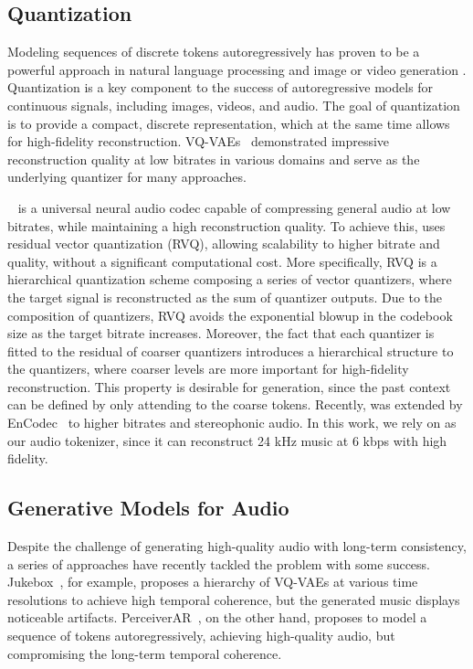 \subsection{Quantization} 

Modeling sequences of discrete tokens autoregressively has proven to be a powerful approach in natural language processing \citep{gpt3, lamda} and image or video generation \citep{esser2021taming,dalle,parti,phenaki}. Quantization is a key component to the success of autoregressive models for continuous signals, including images, videos, and audio. The goal of quantization is to provide a compact, discrete representation, which at the same time allows for high-fidelity reconstruction. VQ-VAEs~\citep{vqvae} demonstrated impressive reconstruction quality at low bitrates in various domains and serve as the underlying quantizer for many approaches.

\soundstream{}~\citep{soundstream} is a universal neural audio codec capable of compressing general audio at low bitrates, while maintaining a high reconstruction quality. To achieve this, \soundstream{} uses residual vector quantization (RVQ), allowing scalability to higher bitrate and quality, without a significant computational cost. More specifically, RVQ is a hierarchical quantization scheme composing a series of vector quantizers, where the target signal is reconstructed as the sum of quantizer outputs. Due to the composition of quantizers, RVQ avoids the exponential blowup in the codebook size as the target bitrate increases. Moreover, the fact that each quantizer is fitted to the residual of coarser quantizers introduces a hierarchical structure to the quantizers, where coarser levels are more important for high-fidelity reconstruction. This property is desirable for generation, since the past context can be defined by only attending to the coarse tokens. Recently, \soundstream{} was extended by EnCodec~\citep{defossez2022highfi} to higher bitrates and stereophonic audio. In this work, we rely on \soundstream{} as our audio tokenizer, since it can reconstruct 24 kHz music at 6 kbps with high fidelity. 

\subsection{Generative Models for Audio}

Despite the challenge of generating high-quality audio with long-term consistency, a series of approaches have recently tackled the problem with some success. Jukebox~\citep{jukebox}, for example, proposes a hierarchy of VQ-VAEs at various time resolutions to achieve high temporal coherence, but the generated music displays noticeable artifacts. PerceiverAR~\citep{perceiverAR}, on the other hand, proposes to model a sequence of \soundstream{} tokens autoregressively, achieving high-quality audio, but compromising the long-term temporal coherence. 

